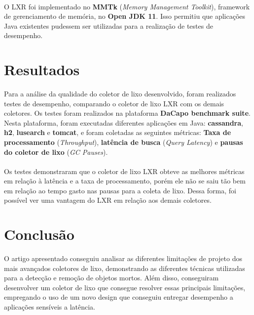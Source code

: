 \documentclass[12pt]{article}
\begin{document}
\paragraph{}O LXR foi implementado no \textbf{MMTk} (\textit{Memory Management Toolkit}), framework de gerenciamento de memória, no \textbf{Open JDK 11}. Isso permitiu que aplicações Java existentes pudessem ser utilizadas para a realização de testes de desempenho.

\section{Resultados}

\paragraph{}Para a análise da qualidade do coletor de lixo desenvolvido, foram realizados testes de desempenho, comparando o coletor de lixo LXR com os demais coletores. Os testes foram realizados na plataforma \textbf{DaCapo benchmark suite}. Nesta plataforma, foram executadas diferentes aplicações em Java: \textbf{cassandra}, \textbf{h2}, \textbf{lusearch} e \textbf{tomcat}, e foram coletadas as seguintes métricas: \textbf{Taxa de processamento} (\textit{Throughput}), \textbf{latência de busca} (\textit{Query Latency}) e \textbf{pausas do coletor de lixo} (\textit{GC Pauses}).

\paragraph{}Os testes demonstraram que o coletor de lixo LXR obteve as melhores métricas em relação à latência e a taxa de processamento, porém ele não se saiu tão bem em relação ao tempo gasto nas pausas para a coleta de lixo. Dessa forma, foi possível ver uma vantagem do LXR em relação aos demais coletores.

\section{Conclusão}

\paragraph{}O artigo apresentado conseguiu analisar as diferentes limitações de projeto dos mais avançados coletores de lixo, demonstrando as diferentes técnicas utilizadas para a detecção e remoção de objetos mortos. Além disso, conseguiram desenvolver um coletor de lixo que consegue resolver essas principais limitações, empregando o uso de um novo design que conseguiu entregar desempenho a aplicações sensíveis a latência.




\nocite{10.1145/3519939.3523440}
\end{document}
